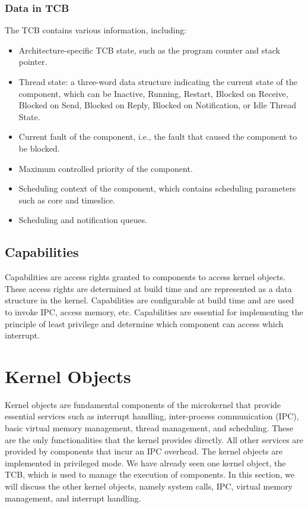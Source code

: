 \documentclass[
	a4paper, %
	11pt, %
	unnumberedsections, %
	twoside, %
]{LTJournalArticle}
\begin{document}
\subsubsection{Data in TCB}
The TCB contains various information, including:
\begin{itemize}
\item Architecture-specific TCB state, such as the program counter and stack pointer.
\item Thread state: a three-word data structure indicating the current state of the component, which can be Inactive, Running, Restart, Blocked on Receive, Blocked on Send, Blocked on Reply, Blocked on Notification, or Idle Thread State.
\item Current fault of the component, i.e., the fault that caused the component to be blocked.
\item Maximum controlled priority of the component.
\item Scheduling context of the component, which contains scheduling parameters such as core and timeslice.
\item Scheduling and notification queues.
\end{itemize}

\subsection{Capabilities}
Capabilities are access rights granted to components to access kernel objects. These access rights are determined at build time and are represented as a data structure in the kernel. Capabilities are configurable at build time and are used to invoke IPC, access memory, etc. Capabilities are essential for implementing the principle of least privilege and determine which component can access which interrupt.


\section{Kernel Objects}

Kernel objects are fundamental components of the microkernel that provide essential services such as interrupt handling, inter-process communication (IPC), basic virtual memory management, thread management, and scheduling. These are the only functionalities that the kernel provides directly. All other services are provided by components that incur an IPC overhead. The kernel objects are implemented in privileged mode. We have already seen one kernel object, the TCB, which is used to manage the execution of components. In this section, we will discuss the other kernel objects, namely system calls, IPC, virtual memory management, and interrupt handling.
\end{document}

